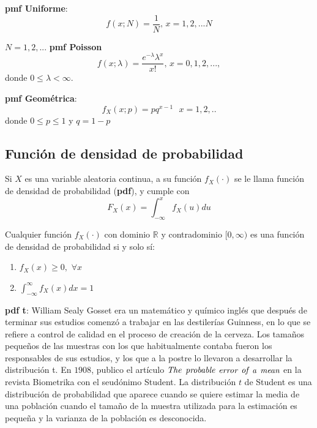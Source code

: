 \vspace{5mm}
\textbf{pmf Uniforme}: 
\begin{equation*}
f(x;N)=\frac{1}{N}\text{, \ }x=1,2,...N
\end{equation*}

$N=1,2,...$
\vspace{5mm}
\textbf{pmf Poisson}
\begin{equation*}
f(x;\lambda )=\frac{e^{-\lambda }\lambda ^{x}}{x!}\text{, \ \ }x=0,1,2,...,
\end{equation*}%
donde $0\leq \lambda <\infty$.

\vspace{5mm}
\textbf{pmf Geométrica}: 
\begin{equation*}
f_{X}(x;p)=pq^{x-1}\text{ \ \ }x=1,2,..
\end{equation*}%
donde $0\leq p\leq 1$ y $q=1-p$


\subsection{Función de densidad de probabilidad}

\begin{definition}[pdf]
Si $X$ es una variable aleatoria continua, a su función $f_{X}(\cdot)$  se le llama función de densidad de probabilidad (\textbf{pdf}), y cumple con
\begin{equation*}
F_{X}(x)=\int_{-\infty }^{x}f_{X}(u)du
\end{equation*}
\end{definition}

\begin{definition}
Cualquier función $f_{X}(\cdot )$ con dominio $\mathbb{R}$ y contradominio $[0,\infty )$ es una función de densidad de probabilidad si y solo sí:
\begin{enumerate}
\item $f_{X}(x)\geq 0,$ $\forall x$
\item $\int_{-\infty }^{\infty }f_{X}(x)dx=1$
\end{enumerate}
\end{definition}

\textbf{pdf t}: William Sealy Gosset era un matemático y químico inglés que después de terminar sus estudios comenzó a trabajar en las destilerías Guinness, en lo que se refiere a control de calidad en el proceso de creación de la cerveza. Los tamaños pequeños de las muestras con los que habitualmente contaba fueron los responsables de sus estudios, y los que a la postre lo llevaron a desarrollar la distribución t. En $1908$, publico el artículo $\emph{The}$ $\emph{probable}$ $\emph{error}$ $\emph{of}$ $\emph{a}$ $\emph{mean}$ en la revista Biometrika con el seudónimo Student. La distribución $t$ de Student es una distribución de probabilidad que aparece cuando se quiere estimar la media de una población cuando el tamaño de la muestra utilizada para la estimación es pequeña y la varianza de la población es desconocida.


